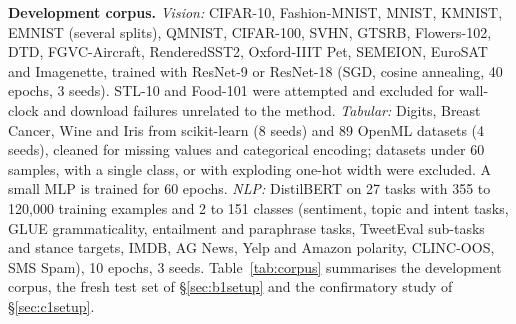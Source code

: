 \documentclass[3p,twocolumn,10pt]{elsarticle}
\theoremstyle{definition}
\begin{document}
\textbf{Development corpus.} \emph{Vision:} CIFAR-10, Fashion-MNIST, MNIST, KMNIST, EMNIST (several splits), QMNIST, CIFAR-100, SVHN, GTSRB, Flowers-102, DTD, FGVC-Aircraft, RenderedSST2, Oxford-IIIT Pet, SEMEION, EuroSAT and Imagenette, trained with ResNet-9 or ResNet-18 (SGD, cosine annealing, 40 epochs, 3 seeds). STL-10 and Food-101 were attempted and excluded for wall-clock and download failures unrelated to the method. \emph{Tabular:} Digits, Breast Cancer, Wine and Iris from scikit-learn (8 seeds) and 89 OpenML datasets (4 seeds), cleaned for missing values and categorical encoding; datasets under 60 samples, with a single class, or with exploding one-hot width were excluded. A small MLP is trained for 60 epochs. \emph{NLP:} DistilBERT on 27 tasks with 355 to 120{,}000 training examples and 2 to 151 classes (sentiment, topic and intent tasks, GLUE grammaticality, entailment and paraphrase tasks, TweetEval sub-tasks and stance targets, IMDB, AG News, Yelp and Amazon polarity, CLINC-OOS, SMS Spam), 10 epochs, 3 seeds. Table~\ref{tab:corpus} summarises the development corpus, the fresh test set of \S\ref{sec:b1setup} and the confirmatory study of \S\ref{sec:c1setup}.
\end{document}
